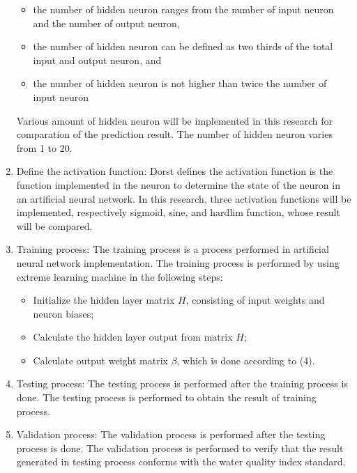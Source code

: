 \documentclass[journal,comsoc]{IEEEtran}
\begin{document}
\begin{enumerate}
\begin{itemize}
\item the number of hidden neuron ranges from the number of input neuron and the number of output neuron,
\item the number of hidden neuron can be defined as two thirds of the total input and output neuron, and
\item the number of hidden neuron is not higher than twice the number of input neuron
\end{itemize}

Various amount of hidden neuron will be implemented in this research for comparation of the prediction result. The number of hidden neuron varies from 1 to 20.

\item Define the activation function: Dorst \cite{Dorst16} defines the activation function is the function implemented in the neuron to determine the state of the neuron in an artificial neural network. In this research, three activation functions will be implemented, respectively sigmoid, sine, and hardlim function, whose result will be compared.

\item Training process: The training process is a process performed in artificial neural network implementation. The training process is performed by using extreme learning machine in the following steps:

\begin{itemize}
\item Initialize the hidden layer matrix $H$, consisting of input weights and neuron biases;
\item Calculate the hidden layer output from matrix $H$;
\item Calculate output weight matrix $\beta$, which is done according to (4).
\end{itemize}

\item Testing process: The testing process is performed after the training process is done. The testing process is performed to obtain the result of training process.

\item Validation process: The validation process is performed after the testing process is done. The validation process is performed to verify that the result generated in testing process conforms with the water quality index standard.

\end{enumerate}
\end{document}

